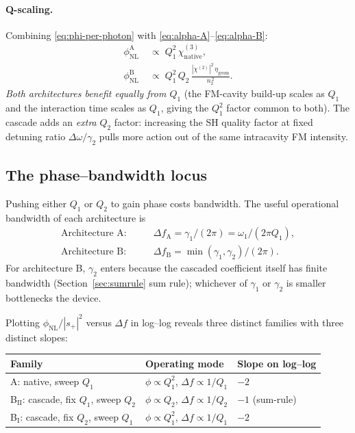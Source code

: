 \documentclass[11pt,a4paper]{article}
\newcommand{\chitwo}{\chi^{(2)}}
\newcommand{\chithree}{\chi^{(3)}}
\newcommand{\Dom}{\Delta\omega}
\begin{document}
\paragraph{Q-scaling.}  Combining \eqref{eq:phi-per-photon} with
\eqref{eq:alpha-A}--\eqref{eq:alpha-B}:
\begin{align}
  \phi_\text{NL}^\text{A} &\;\propto\;Q_1^{2}\,\chithree_\text{native},
  \label{eq:phi-A-scaling}\\[2pt]
  \phi_\text{NL}^\text{B} &\;\propto\;Q_1^{2}\,Q_2\,\frac{|\chitwo|^{2}\,\eta_\text{geom}}{n_2^{\,2}}.
  \label{eq:phi-B-scaling}
\end{align}
\emph{Both architectures benefit equally from $Q_1$} (the FM-cavity
build-up scales as $Q_1$ and the interaction time scales as $Q_1$,
giving the $Q_1^{2}$ factor common to both).  The cascade adds an
\emph{extra} $Q_2$ factor: increasing the SH quality factor at fixed
detuning ratio $\Dom/\gamma_2$ pulls more action out of the same
intracavity FM intensity.

\subsection*{The phase--bandwidth locus}

Pushing either $Q_1$ or $Q_2$ to gain phase costs bandwidth.  The
useful operational bandwidth of each architecture is
\begin{align*}
  \text{Architecture A:}\qquad &\Delta f_\text{A}=\gamma_1/(2\pi)
        =\omega_1/(2\pi Q_1),\\
  \text{Architecture B:}\qquad &\Delta f_\text{B}=\min(\gamma_1,\gamma_2)/(2\pi).
\end{align*}
For architecture B, $\gamma_2$ enters because the cascaded coefficient
itself has finite bandwidth (Section~\ref{sec:sumrule} sum rule); whichever
of $\gamma_1$ or $\gamma_2$ is smaller bottlenecks the device.

Plotting $\phi_\text{NL}/|s_+|^{2}$ versus $\Delta f$ in log--log
reveals three distinct families with three distinct slopes:

\begin{center}
\begin{tabular}{lll}
\toprule
Family & Operating mode & Slope on log--log \\
\midrule
A: native, sweep $Q_1$            &
   $\phi\!\propto\! Q_1^{2}$, $\Delta f\!\propto\!1/Q_1$ &
   $-2$ \\
B$_\text{II}$: cascade, fix $Q_1$, sweep $Q_2$ &
   $\phi\!\propto\!Q_2$, $\Delta f\!\propto\!1/Q_2$ &
   $-1$ (sum-rule) \\
B$_\text{I}$: cascade, fix $Q_2$, sweep $Q_1$ &
   $\phi\!\propto\!Q_1^{2}$, $\Delta f\!\propto\!1/Q_1$ &
   $-2$ \\
\bottomrule
\end{tabular}
\end{center}
\end{document}
